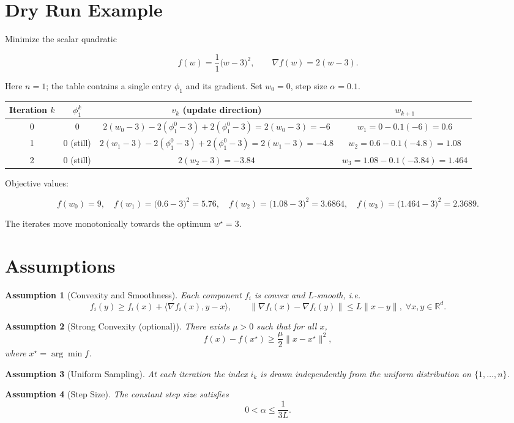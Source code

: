 \documentclass{article}
\newtheorem{assumption}{Assumption}
\newcommand{\R}{\mathbb{R}}
\begin{document}
\section*{Dry Run Example}
Minimize the scalar quadratic  

\[
f(w)=\frac{1}{1}\bigl(w-3\bigr)^{2},\qquad \nabla f(w)=2(w-3).
\]

Here \(n=1\); the table contains a single entry \(\phi_1\) and its gradient.
Set \(w_0=0\), step size \(\alpha=0.1\).

\begin{center}
\begin{tabular}{c|c|c|c}
Iteration $k$ & $\phi_1^{k}$ & $v_k$ (update direction) & $w_{k+1}$ \\ \hline
0 & $0$ & $2(w_0-3)-2(\phi_1^{0}-3)+2(\phi_1^{0}-3)=2(w_0-3)=-6$ & $w_1=0-0.1(-6)=0.6$ \\[2mm]
1 & $0$ (still) & $2(w_1-3)-2(\phi_1^{0}-3)+2(\phi_1^{0}-3)=2(w_1-3)=-4.8$ & $w_2=0.6-0.1(-4.8)=1.08$ \\[2mm]
2 & $0$ (still) & $2(w_2-3)=-3.84$ & $w_3=1.08-0.1(-3.84)=1.464$ \\ 
\end{tabular}
\end{center}

Objective values:  

\[
f(w_0)=9,\quad f(w_1)=\bigl(0.6-3\bigr)^2=5.76,\quad 
f(w_2)=\bigl(1.08-3\bigr)^2=3.6864,\quad 
f(w_3)=\bigl(1.464-3\bigr)^2=2.3689.
\]

The iterates move monotonically towards the optimum \(w^{\star}=3\).

\newpage
\section*{Assumptions}
\begin{assumption}[Convexity and Smoothness]\label{ass:convex}
Each component \(f_i\) is convex and \(L\)-smooth, i.e.
\[
f_i(y)\ge f_i(x)+\langle\nabla f_i(x),y-x\rangle,\qquad
\|\nabla f_i(x)-\nabla f_i(y)\|\le L\|x-y\|,
\;\forall x,y\in\R^{d}.
\]
\end{assumption}
\begin{assumption}[Strong Convexity (optional)]\label{ass:strong}
There exists \(\mu>0\) such that for all \(x\),
\[
f(x)-f(x^{\star})\ge\frac{\mu}{2}\|x-x^{\star}\|^{2},
\]
where \(x^{\star}=\arg\min f\).
\end{assumption}
\begin{assumption}[Uniform Sampling]\label{ass:sampling}
At each iteration the index \(i_k\) is drawn independently from the uniform
distribution on \(\{1,\dots ,n\}\).
\end{assumption}
\begin{assumption}[Step Size]\label{ass:stepsize}
The constant step size satisfies  
\[
0<\alpha\le \frac{1}{3L}.
\]
\end{assumption}
\end{document}
